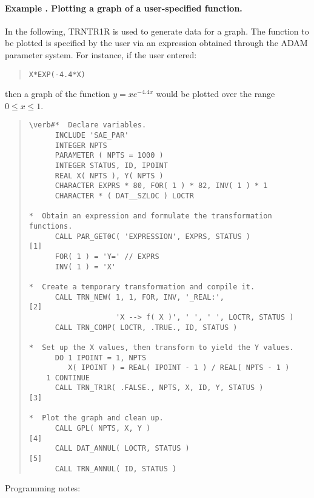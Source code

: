 \documentclass[twoside,11pt]{article}
\renewcommand{\_}{\texttt{\symbol{95}}}
\newcommand{\name}[1]{\mbox{\small{#1}}}
\newcounter{examplecounter}
\newcommand{\example}[1]{\addtocounter{examplecounter}{1}
                         \paragraph{\textbf{Example \theexamplecounter. #1}}}
\begin{document}
\example{Plotting a graph of a user-specified function.}
In the following, \name{TRN\_TR1R} is used to generate data for a graph.
The function to be plotted is specified by the user via an expression
obtained through the \name{ADAM} parameter system.
For instance, if the user entered:

\begin{quote}
\begin{verbatim}
X*EXP(-4.4*X)
\end{verbatim}
\end{quote}

then a graph of the function \mbox{$y=xe^{-4.4x}$} would be plotted over the
range \mbox{$0\le x\le 1$}.

\begin{quote}
\begin{verbatim}
\verb#*  Declare variables.
      INCLUDE 'SAE_PAR'
      INTEGER NPTS
      PARAMETER ( NPTS = 1000 )
      INTEGER STATUS, ID, IPOINT
      REAL X( NPTS ), Y( NPTS )
      CHARACTER EXPRS * 80, FOR( 1 ) * 82, INV( 1 ) * 1
      CHARACTER * ( DAT__SZLOC ) LOCTR

*  Obtain an expression and formulate the transformation functions.
      CALL PAR_GET0C( 'EXPRESSION', EXPRS, STATUS )           [1]
      FOR( 1 ) = 'Y=' // EXPRS
      INV( 1 ) = 'X'

*  Create a temporary transformation and compile it.
      CALL TRN_NEW( 1, 1, FOR, INV, '_REAL:',                 [2]
                    'X --> f( X )', ' ', ' ', LOCTR, STATUS )
      CALL TRN_COMP( LOCTR, .TRUE., ID, STATUS )

*  Set up the X values, then transform to yield the Y values.
      DO 1 IPOINT = 1, NPTS
         X( IPOINT ) = REAL( IPOINT - 1 ) / REAL( NPTS - 1 )
    1 CONTINUE
      CALL TRN_TR1R( .FALSE., NPTS, X, ID, Y, STATUS )        [3]

*  Plot the graph and clean up.
      CALL GPL( NPTS, X, Y )                                  [4]
      CALL DAT_ANNUL( LOCTR, STATUS )                         [5]
      CALL TRN_ANNUL( ID, STATUS )

\end{verbatim}
\end{quote}

Programming notes:
\end{document}
